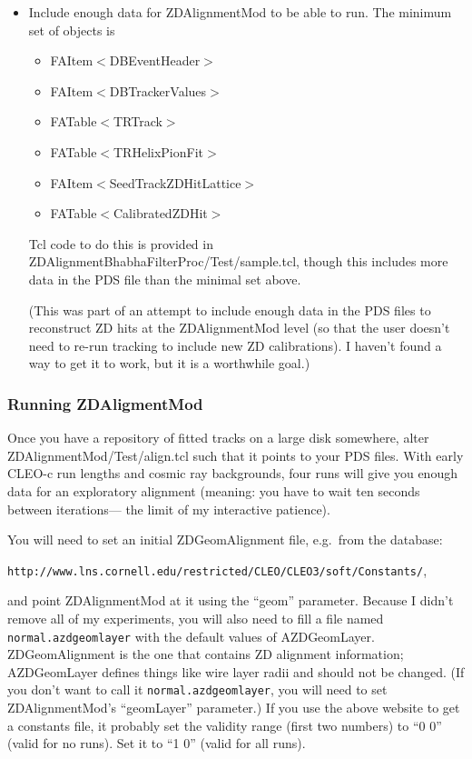 \documentclass[12pt]{article}
\begin{document}
\begin{itemize}
  \item Include enough data for ZDAlignmentMod to be able to run.  The
  minimum set of objects is
  \begin{itemize}
    \item FAItem$<$DBEventHeader$>$
    \item FAItem$<$DBTrackerValues$>$
    \item FATable$<$TRTrack$>$
    \item FATable$<$TRHelixPionFit$>$
    \item FAItem$<$SeedTrackZDHitLattice$>$
    \item FATable$<$CalibratedZDHit$>$
  \end{itemize}
  Tcl code to do this is provided in
  ZDAlignmentBhabhaFilterProc/Test/sample.tcl, though this includes
  more data in the PDS file than the minimal set above.

  (This was part of an attempt to include enough data in the PDS files
  to reconstruct ZD hits at the ZDAlignmentMod level (so that the user
  doesn't need to re-run tracking to include new ZD calibrations).  I
  haven't found a way to get it to work, but it is a worthwhile goal.)

\end{itemize}

\subsubsection{Running ZDAligmentMod}

Once you have a repository of fitted tracks on a large disk somewhere,
alter ZDAlignmentMod/Test/align.tcl such that it points to your PDS
files.  With early CLEO-c run lengths and cosmic ray backgrounds, four
runs will give you enough data for an exploratory alignment (meaning:
you have to wait ten seconds between iterations--- the limit of my
interactive patience).

You will need to set an initial ZDGeomAlignment file, e.g.\ from the
database: \label{constantsweb}
\begin{center}
{\tt http://www.lns.cornell.edu/restricted/CLEO/CLEO3/soft/Constants/},
\end{center}
and point ZDAlignmentMod at it using the ``geom'' parameter.  Because
I didn't remove all of my experiments, you will also need to fill a
file named {\tt normal.azdgeomlayer} with the default values of
AZDGeomLayer.  ZDGeomAlignment is the one that contains ZD alignment
information; AZDGeomLayer defines things like wire layer radii and
should not be changed.  (If you don't want to call it
{\tt normal.azdgeomlayer}, you will need to set ZDAlignmentMod's
``geomLayer'' parameter.)  If you use the above website to get a
constants file, it probably set the validity range (first two numbers)
to ``0 0'' (valid for no runs).  Set it to ``1 0'' (valid for all
runs).
\end{document}
